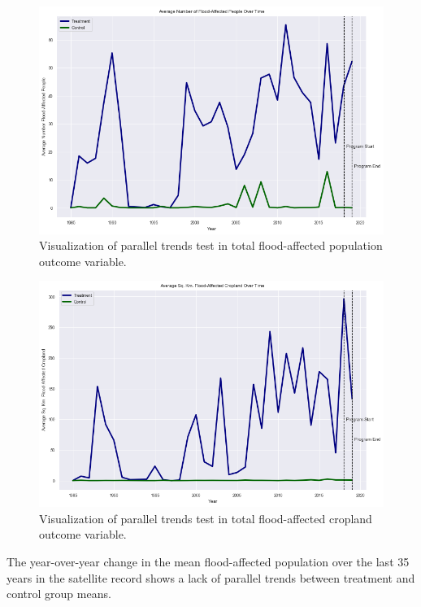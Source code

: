 \begin{figure}
  \begin{center}
    \includegraphics[scale=0.6]{images/05-parallel-trends-population.png}
  \end{center}
  \caption{Visualization of parallel trends test in total flood-affected population outcome variable.}
\end{figure}

\begin{figure}
  \begin{center}
    \includegraphics[scale=0.6]{images/06-parallel-trends-cropland.png}
  \end{center}
  \caption{Visualization of parallel trends test in total flood-affected cropland outcome variable.}
\end{figure}

The year-over-year change in the mean flood-affected population over the last 35 years in the satellite record shows a lack of parallel trends between treatment and control group means.


